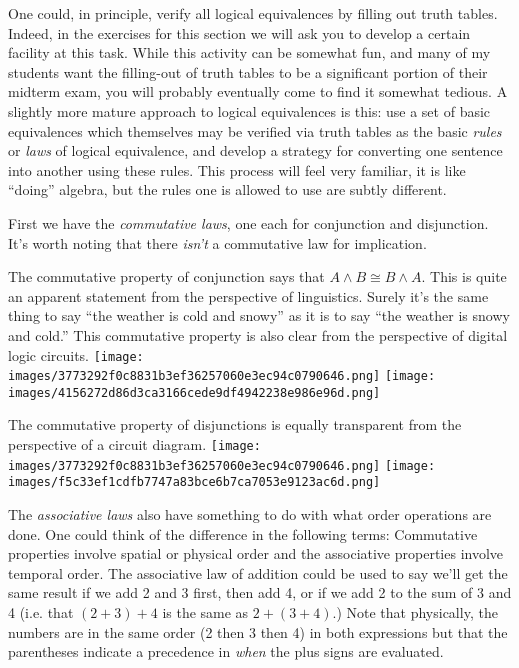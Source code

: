 \documentclass[10pt,]{book}
\theoremstyle{plain}
\theoremstyle{definition}
\theoremstyle{definition}
\numberwithin{equation}{section}
\begin{document}
    One could, in principle, verify all logical equivalences by filling out
    truth tables. Indeed, in the exercises for this section we will ask you
    to develop a certain facility at this task. While this activity can
    be somewhat fun, and many of my students want the filling-out of truth
    tables to
    be a significant portion of their midterm exam, you will probably eventually
    come to find it somewhat tedious. A slightly more mature approach to logical
    equivalences is this: use a set of basic equivalences \textemdash{} which themselves
    may be verified via truth tables \textemdash{} as the basic \emph{rules} or
    \emph{laws}
    of logical equivalence, and develop a strategy for converting one
    sentence into another using these rules. This process will feel very
    familiar, it is like ``doing'' algebra, but the rules one is allowed
    to use are subtly different.
\par

    First we have the \emph{commutative laws},
    one each for conjunction
    and disjunction. It's worth noting that there \emph{isn't} a commutative
    law for implication.
\par

    The commutative property of conjunction says that \(A \land B \cong B \land A\).
    This is quite an apparent statement from the perspective of linguistics.
    Surely it's the same thing to say ``the weather is cold and snowy'' as it is to
    say ``the weather is snowy and cold.''
    This commutative property is also clear
    from the perspective of digital logic circuits.
\texttt{[image: images/3773292f0c8831b3ef36257060e3ec94c0790646.png]}
\texttt{[image: images/4156272d86d3ca3166cede9df4942238e986e96d.png]}
\par

    The commutative property of disjunctions is equally transparent from
    the perspective of a circuit diagram.
\texttt{[image: images/3773292f0c8831b3ef36257060e3ec94c0790646.png]}
\texttt{[image: images/f5c33ef1cdfb7747a83bce6b7ca7053e9123ac6d.png]}
\par

    The \emph{associative laws} also have something to do with what order operations
    are done. One could think of the difference in the following terms:
    Commutative properties
    involve spatial or physical order and the associative properties involve
    temporal order. The associative law of addition could be used to say we'll
    get the same result if we add 2 and 3 first, then add 4, or if we add 2 to the
    sum of 3 and 4 (i.e. that \((2+3)+4\) is the same as \(2+(3+4)\).) Note that
    physically, the numbers are in the same order (2 then 3 then 4) in both
    expressions but that the parentheses indicate a precedence in \emph{when} the
    plus signs are evaluated.
\par
\end{document}
